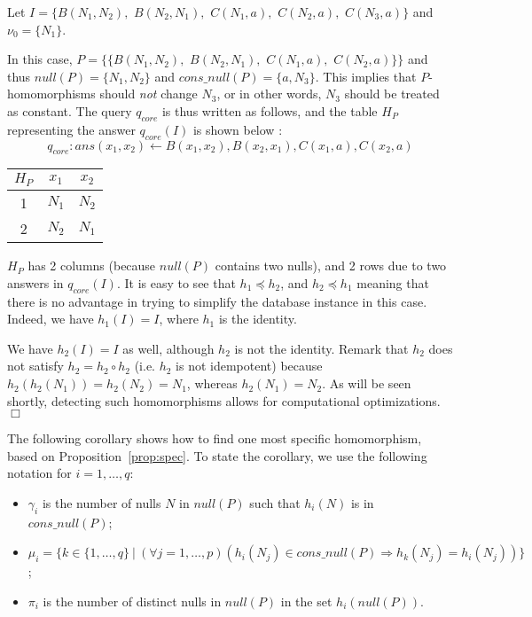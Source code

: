\begin{example}\label{ex:most-spec}
    {\rm
        Let $I=\{B(N_1,N_2),$ $B(N_2,N_1),$ $C(N_1,a),$ $C(N_2,a),$ $C(N_3,a)\}$ and $\nu_0=\{N_1\}$.

        In this case, $P=\{\{B(N_1,N_2),$ $B(N_2,N_1),$ $C(N_1,a),$ $C(N_2,a)\}\}$ and thus $null(P)=\{N_1, N_2\}$ and $cons\_null(P)=\{a, N_3\}$.
        This implies that $P$-homomorphisms should \emph{not} change $N_3$, or in other words, $N_3$ should be treated as constant.
        The query $q_{core}$ is thus written as follows, and the table $H_P$ representing the answer $q_{core}(I)$ is shown below :
        \[
            q_{core}: ans(x_1,x_2) \leftarrow B(x_1,x_2), B(x_2,x_1), C(x_1,a), C(x_2,a)
        \]

        \begin{center}
            \begin{tabular}{c|cc}
                $H_P$ & $x_1$  & $x_2$ \\ \hline
                1     & $N_1 $ & $N_2$ \\
                2     & $N_2 $ & $N_1$ \\
            \end{tabular}
        \end{center}

        $H_P$ has 2 columns (because $null(P)$ contains two nulls), and 2 rows due to two answers in $q_{core}(I)$.
        It is easy to see that $h_1 \preceq h_2$, and $h_2 \preceq h_1$ meaning that there is no advantage in trying to simplify the database instance in this case.
        Indeed, we have $h_1(I) = I$, where $h_1$ is the identity.

        We have $h_2(I) = I$ as well, although $h_2 $ is not the identity.
        Remark that $h_2$ does not satisfy $h_2 = h_2 \circ h_2$ (i.e. $h_2$ is not idempotent) because $h_2(h_2(N_1))=h_2(N_2)=N_1$, whereas $h_2(N_1)=N_2$.
        As will be seen shortly, detecting such homomorphisms allows for computational optimizations.
        \hfill$\Box$}
\end{example}

The following corollary shows how to find one most specific homomorphism, based on Proposition~\ref{prop:spec}.
To state the corollary, we use the following notation for $i=1, \ldots,q$:
\begin{itemize}
    \item
          $\gamma_i$ is the number of nulls $N$ in $null(P)$ such that $h_i(N)$ is in $cons\_null(P)$;
    \item
          $\mu_i=\{k \in \{1, \ldots, q\}~|~(\forall j=1, \ldots, p) (h_i(N_j) \in cons\_null(P) \Rightarrow h_k(N_j) = h_i(N_j))\}$;
    \item
          $\pi_i$ is the number of distinct nulls in $null(P)$ in the set $h_i(null(P))$.
\end{itemize}

